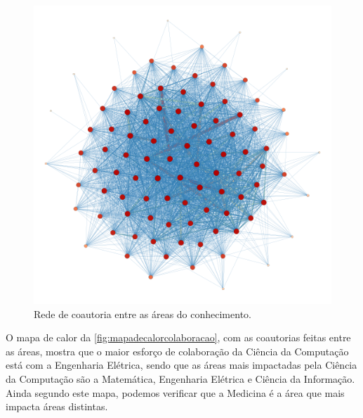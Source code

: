 \begin{figure}[htpb]
  \centering
  \includegraphics[width=1\textwidth]{figuras/resultados-grafo-colaboracao-entre-areas}
  \caption{Rede de coautoria entre as áreas do conhecimento.}
  \label{fig:grafocolaboracao}
\end{figure}

O mapa de calor da \autoref{fig:mapadecalorcolaboracao}, com as coautorias feitas entre as áreas, mostra que o maior esforço de colaboração da Ciência da Computação está com a Engenharia Elétrica, sendo que as áreas mais impactadas pela Ciência da Computação são a Matemática, Engenharia Elétrica e Ciência da Informação. Ainda segundo este mapa, podemos verificar que a Medicina é a área que mais impacta áreas distintas.

